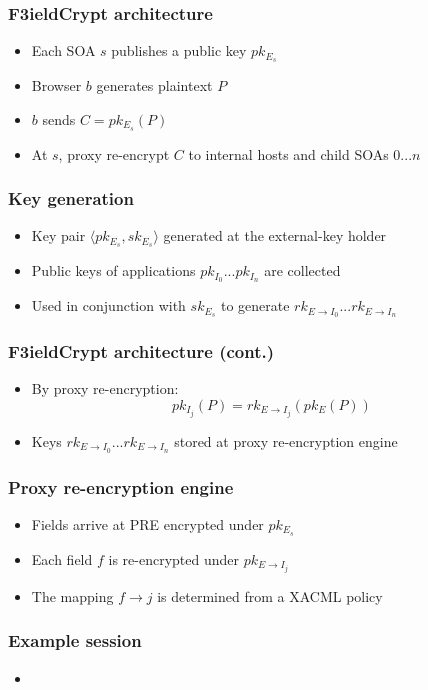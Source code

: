 \documentclass{beamer}
\begin{document}
\begin{frame}
\frametitle{F3ieldCrypt architecture}
\begin{itemize}
\item Each SOA $s$ publishes a public key $pk_{E_s}$
\item Browser $b$ generates plaintext $P$
\item $b$ sends $C = pk_{E_s}(P)$ 
\item At $s$, proxy re-encrypt $C$ to internal hosts and child SOAs $0...n$ 
\end{itemize}
\end{frame}

\begin{frame}
\frametitle{Key generation}
\begin{itemize}
\item Key pair $\langle pk_{E_s}, sk_{E_s} \rangle$ generated at the
\alert{external-key holder}
\item Public keys of applications $pk_{I_0}...pk_{I_n}$ are collected
\item Used in conjunction with $sk_{E_s}$ to generate $rk_{E \to I_0}...rk_{E
\to I_n}$
\end{itemize}
\end{frame}

\begin{frame}
\frametitle{F3ieldCrypt architecture (cont.)}
\begin{itemize}
\item By proxy re-encryption:
\begin{equation*}
pk_{I_j}(P) = rk_{E \to I_j}( pk_E (P))
\end{equation*}
\item Keys $rk_{E \to I_0}...rk_{E \to I_n}$ stored at \alert{proxy
re-encryption engine}
\end{itemize}
\end{frame}

\begin{frame}
\frametitle{Proxy re-encryption engine}
\begin{itemize}
\item Fields arrive at PRE encrypted under $pk_{E_s}$
\item Each field $f$ is re-encrypted under $pk_{E \to I_j}$
\item The mapping $f \to j$ is determined from a XACML policy
\end{itemize}
\end{frame}

\begin{frame}
\frametitle{Example session}
\begin{itemize}
\item
\end{itemize}
\end{frame}
\end{document}
